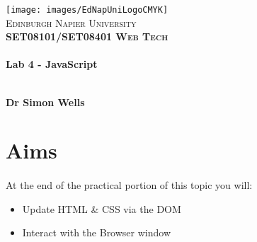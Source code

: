 \documentclass[10pt, a4paper, twosize]{article}
\begin{document}

\begin{titlepage}
\vspace*{5cm}
\begin{center}
\texttt{[image: images/EdNapUniLogoCMYK]}~\\[1cm]

\textsc{\Large Edinburgh Napier University}\\[1.5cm]

\textsc{\LARGE \bfseries SET08101/SET08401 Web Tech}\\[0.5cm]

\hrulefill \\[0.4cm]
{\huge \bfseries Lab 4 - JavaScript \\[0.4cm] }
\hrulefill \\[1.5cm]

\begin{minipage}{0.4\textwidth}
\begin{flushleft} \large
\textbf{Dr Simon Wells} \\
\end{flushleft}
\end{minipage}

\vfill

\end{center}
\end{titlepage}




%

\section{Aims}
\paragraph{} At the end of the practical portion of this topic you will:

\begin{itemize}
\item Update HTML \& CSS via the DOM
\item Interact with the Browser window
\end{itemize}
\end{document}
